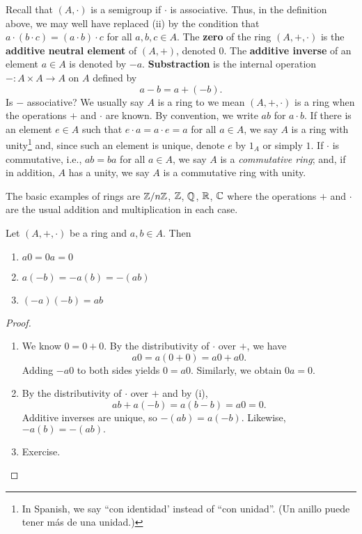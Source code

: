 \documentclass[11pt,a4paper]{article}
\begin{document}
%
Recall that  $(A,\cdot)$ is a semigroup if \(\cdot\) is associative.
Thus, in the definition above, we may well have replaced (ii) by the condition that \(a\cdot(b\cdot c) = (a \cdot b)\cdot c\) for all \(a,b,c\in A\).
The \textbf{zero} of the ring \((A,+,\cdot)\) is the  \textbf{additive neutral element} of $(A,+)$, denoted $0$.
The \textbf{additive inverse} of an element $a\in A$ is denoted by $-a$.
\textbf{Substraction} is the internal operation \(-\colon A\times A\to A\) on $A$ defined by
\[
a-b = a+(-b).
\]
Is \(-\) associative?
We usually say \(A\) is a ring to we mean \((A,+,\cdot)\) is a ring when the operations \(+\) and \(\cdot\) are known.
By convention, we write $ab$ for  $a\cdot b$.
If there is an element \(e\in A\) such that \(e \cdot a = a \cdot e = a\) for all \(a\in A\), we say \(A\) is a ring with unity\footnote{In Spanish, we say ``con identidad' instead of ``con unidad''. (Un anillo puede tener más de una unidad.)}
and, since such an element is unique,  denote  \(e\) by \(1_A\) or simply \(1\). 
If \(\cdot\) is commutative, i.e., \(ab = ba\) for all \(a\in A\), we say \(A\) is a \textit{commutative ring}; and, if in addition, \(A\) has a unity, we say \(A\) is a commutative ring with unity.




%



\begin{exa}
    The basic examples of rings are \(\mathbb{Z}/n\mathbb{Z}\), $\mathbb{Z}$, $\mathbb{Q}$, $\mathbb{R}$, $\mathbb{C}$ where the operations $+$ and $\cdot$ are the usual addition and multiplication in each case.
\end{exa}
 
\begin{teo}
Let $(A,+,\cdot)$ be a ring and
$a,b \in A$. Then 
\begin{enumerate}[label=(\roman*)]
    \item \(a 0 = 0 a = 0\)
    \item \(a (-b) = -a (b) = -(a b)\)
    \item \((-a)(-b) = a b\)
\end{enumerate}
\end{teo} 

\begin{proof}
\begin{enumerate}[label=(\roman*)]
    \item We know \(0 = 0 + 0\). By the distributivity of \(\cdot\) over \(+\), we have  
    \[
    a 0=a (0+0)=a 0+a 0.
    \]
    Adding \(-a0\) to both sides yields \(0=a0\). 
    Similarly, we obtain \(0a=0\). 
\item By the distributivity of \(\cdot\) over \(+\) and by (i), 
    \[a b+a(-b)=a (b-b) = a0=0.\]
    Additive inverses are unique, so \(-(a b)=a (-b)\). 
    Likewise, \(-a (b)=-(a b).\)
    \item Exercise.
\end{enumerate}
\end{proof}
\end{document}
